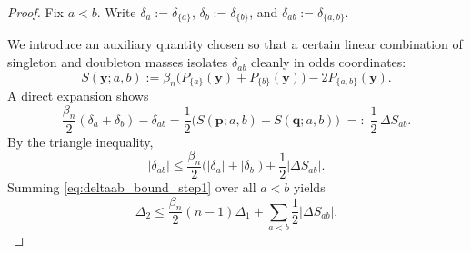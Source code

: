 \documentclass[10pt,a4paper]{amsart}
\newcommand{\abs}[1]{\left|#1\right|}
\newcommand{\pvec}{\vct{p}}
\newcommand{\qvec}{\vct{q}}
\newcommand{\vct}[1]{\mathbf{#1}}
\newcommand{\yvec}{\vct{y}}
\begin{document}
\begin{proof}
Fix $a<b$.
Write $\delta_a:=\delta_{\{a\}}$, $\delta_b:=\delta_{\{b\}}$, and $\delta_{ab}:=\delta_{\{a,b\}}$.

We introduce an auxiliary quantity chosen so that a certain linear combination of singleton and doubleton masses isolates $\delta_{ab}$ cleanly in odds coordinates:
\[
S(\yvec;a,b)
:=\beta_n\big(P_{\{a\}}(\yvec)+P_{\{b\}}(\yvec)\big)-2P_{\{a,b\}}(\yvec).
\]
A direct expansion shows
\begin{equation}\label{eq:deltaab_identity}
\frac{\beta_n}{2}(\delta_a+\delta_b)-\delta_{ab}
=\frac12\Big(S(\pvec;a,b)-S(\qvec;a,b)\Big)
\;=:\;\frac12\,\Delta S_{ab}.
\end{equation}
By the triangle inequality,
\begin{equation}\label{eq:deltaab_bound_step1}
\abs{\delta_{ab}}
\le \frac{\beta_n}{2}\big(\abs{\delta_a}+\abs{\delta_b}\big)+\frac12\abs{\Delta S_{ab}}.
\end{equation}
Summing \eqref{eq:deltaab_bound_step1} over all $a<b$ yields
\begin{equation}\label{eq:Delta2_split}
\Delta_2
\le \frac{\beta_n}{2}(n-1)\Delta_1+\sum_{a<b}\frac12\abs{\Delta S_{ab}}.
\end{equation}


\end{proof}
\end{document}
